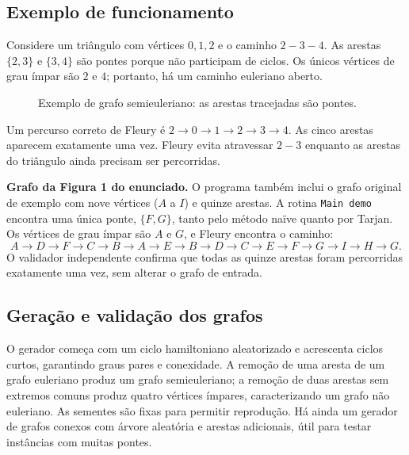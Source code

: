 \documentclass[12pt,a4paper]{article}
\newcommand{\naive}{na\"ive}
\begin{document}
\subsection{Exemplo de funcionamento}
Considere um triângulo com vértices $0,1,2$ e o caminho $2-3-4$.
As arestas $\{2,3\}$ e $\{3,4\}$ são pontes porque não participam de
ciclos. Os únicos vértices de grau ímpar são $2$ e $4$; portanto, há
um caminho euleriano aberto.

\begin{figure}[H]
\centering
{}
\caption{Exemplo de grafo semieuleriano: as arestas tracejadas são pontes.}
\label{fig:exemplo}
\end{figure}

Um percurso correto de Fleury é
$2\rightarrow0\rightarrow1\rightarrow2\rightarrow3\rightarrow4$.
As cinco arestas aparecem exatamente uma vez. Fleury evita atravessar
$2-3$ enquanto as arestas do triângulo ainda precisam ser percorridas.


\noindent\textbf{Grafo da Figura 1 do enunciado.}
O programa também inclui o grafo original de exemplo com nove vértices
($A$ a $I$) e quinze arestas. A rotina \texttt{Main demo} encontra uma
única ponte, $\{F,G\}$, tanto pelo método \naive{} quanto por Tarjan.
Os vértices de grau ímpar são $A$ e $G$, e Fleury encontra o caminho:
\[
A\to D\to F\to C\to B\to A\to E\to B\to D\to C
\to E\to F\to G\to I\to H\to G.
\]
O validador independente confirma que todas as quinze arestas foram
percorridas exatamente uma vez, sem alterar o grafo de entrada.

\subsection{Geração e validação dos grafos}
O gerador começa com um ciclo hamiltoniano aleatorizado e acrescenta
ciclos curtos, garantindo graus pares e conexidade. A remoção de uma
aresta de um grafo euleriano produz um grafo semieuleriano; a remoção
de duas arestas sem extremos comuns produz quatro vértices ímpares,
caracterizando um grafo não euleriano. As sementes são fixas para permitir
reprodução. Há ainda um gerador de grafos conexos com árvore aleatória e
arestas adicionais, útil para testar instâncias com muitas pontes.
\end{document}
